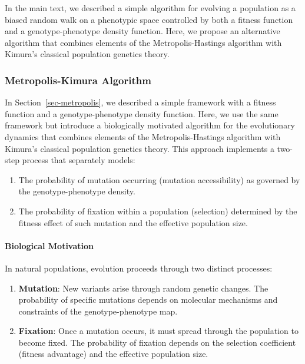 \documentclass[
]{scrartcl}
\let\oldparagraph\paragraph
\renewcommand{\paragraph}[1]{\oldparagraph{#1}\mbox{}}
\providecommand{\tightlist}{%
  \setlength{\itemsep}{0pt}\setlength{\parskip}{0pt}}\usepackage{longtable,booktabs,array}
\begin{document}
\begin{refsection}
In the main text, we described a simple algorithm for evolving a
population as a biased random walk on a phenotypic space controlled by
both a fitness function and a genotype-phenotype density function. Here,
we propose an alternative algorithm that combines elements of the
Metropolis-Hastings algorithm with Kimura's classical population
genetics theory.

\subsubsection{Metropolis-Kimura
Algorithm}\label{metropolis-kimura-algorithm}

In Section~\ref{sec-metropolis}, we described a simple framework with a
fitness function and a genotype-phenotype density function. Here, we use
the same framework but introduce a biologically motivated algorithm for
the evolutionary dynamics that combines elements of the
Metropolis-Hastings algorithm with Kimura's classical population
genetics theory. This approach implements a two-step process that
separately models:

\begin{enumerate}
\def\labelenumi{\arabic{enumi}.}
\tightlist
\item
  The probability of mutation occurring (mutation accessibility) as
  governed by the genotype-phenotype density.
\item
  The probability of fixation within a population (selection) determined
  by the fitness effect of such mutation and the effective population
  size.
\end{enumerate}

\paragraph{Biological Motivation}\label{biological-motivation}

In natural populations, evolution proceeds through two distinct
processes:

\begin{enumerate}
\def\labelenumi{\arabic{enumi}.}
\item
  \textbf{Mutation}: New variants arise through random genetic changes.
  The probability of specific mutations depends on molecular mechanisms
  and constraints of the genotype-phenotype map.
\item
  \textbf{Fixation}: Once a mutation occurs, it must spread through the
  population to become fixed. The probability of fixation depends on the
  selection coefficient (fitness advantage) and the effective population
  size.
\end{enumerate}


\end{refsection}
\end{document}

